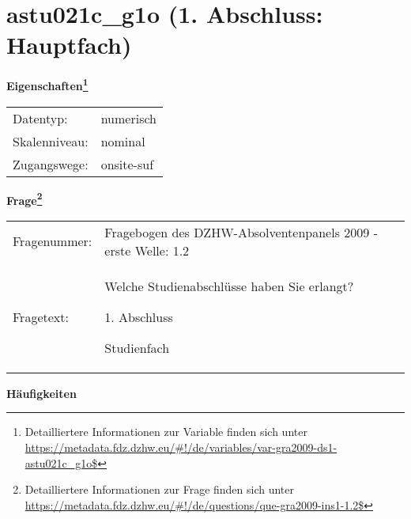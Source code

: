 
    \setcounter{footnote}{0}

    \vspace*{-1.8cm}
	\section{astu021c\_g1o (1. Abschluss: Hauptfach)}
	\label{section:astu021c_g1o}



    \vspace*{0.5cm}
    \noindent\textbf{Eigenschaften\footnote{Detailliertere Informationen zur Variable finden sich unter
		\url{https://metadata.fdz.dzhw.eu/\#!/de/variables/var-gra2009-ds1-astu021c_g1o$}}}\\
	\begin{tabularx}{\hsize}{@{}lX}
	Datentyp: & numerisch \\
	Skalenniveau: & nominal \\
	Zugangswege: &
	  onsite-suf
 \\
    \end{tabularx}



				\vspace*{0.5cm}
                \noindent\textbf{Frage\footnote{Detailliertere Informationen zur Frage finden sich unter
		              \url{https://metadata.fdz.dzhw.eu/\#!/de/questions/que-gra2009-ins1-1.2$}}}\\
				\begin{tabularx}{\hsize}{@{}lX}
					Fragenummer: &
					  Fragebogen des DZHW-Absolventenpanels 2009 - erste Welle:
					  1.2
 \\
					Fragetext: & Welche Studienabschlüsse haben Sie erlangt?\par  1. Abschluss\par  Studienfach \\
				\end{tabularx}





        		\vspace*{0.5cm}
                \noindent\textbf{Häufigkeiten}

